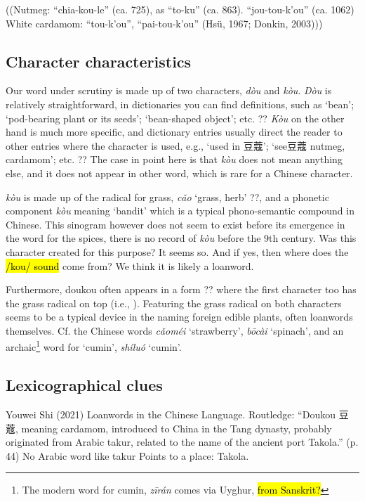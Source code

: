 \documentclass[12pt]{article}
\newcommand{\tc}[1]{\traditionalchinesefont{#1}\rmfamily}
\begin{document}
((Nutmeg: “chia-kou-le” (ca. 725), as “to-ku” (ca. 863). “jou-tou-k’ou” (ca. 1062)
White cardamom: “tou-k’ou”, “pai-tou-k’ou” (Hsü, 1967; Donkin, 2003)))



\subsection{Character characteristics}

Our word under scrutiny is made up of two characters, \tc{豆} \textit{dòu} and \tc{蔻} \textit{kòu}. \textit{Dòu} is relatively straightforward, in dictionaries you can find definitions, such as `bean'; `pod-bearing plant or its seeds'; `bean-shaped object'; etc. ?? \textit{Kòu} on the other hand is much more specific, and dictionary entries usually direct the reader to other entries where the character is used, e.g., `used in 豆蔻'; `see豆蔻 nutmeg, cardamom'; etc. ?? The case in point here is that \textit{kòu} does not mean anything else, and it does not appear in other word, which is rare for a Chinese character. 

\tc{蔻} \textit{kòu} is made up of the radical for grass, \tc{艹} \textit{cǎo} `grass, herb' ??, and a phonetic component \tc{寇} \textit{kòu} meaning `bandit' which is a typical phono-semantic compound in Chinese. This sinogram however does not seem to exist before its emergence in the word for the spices, there is no record of \tc{蔻} \textit{kòu} before the 9th century. Was this character created for this purpose? It seems so. And if yes, then where does the \hl{/kou/ sound} come from? We think it is likely a loanword.

Furthermore, doukou often appears in a form ?? where the first character too has the grass radical on top (i.e., \tc{荳蔻}). Featuring the grass radical on both characters seems to be a typical device in the naming foreign edible plants, often loanwords themselves. Cf. the Chinese words \tc{草莓} \textit{cǎoméi} `strawberry', \tc{菠菜} \textit{bōcài} `spinach', and an archaic\footnote{The modern word for cumin, \tc{孜然} \textit{zī​rán} comes via Uyghur, \hl{from Sanskrit?}} word for `cumin', \tc{蒔蘿} \textit{shíluó} `cumin'.

\subsection{Lexicographical clues}

Youwei Shi (2021) Loanwords in the Chinese Language. Routledge:
	“Doukou 豆蔻, meaning cardamom, introduced to China in the 	Tang dynasty, probably originated from Arabic takur, related to 	the name of the ancient port Takola.” (p. 44)
No Arabic word like takur
Points to a place: Takola.
\end{document}
